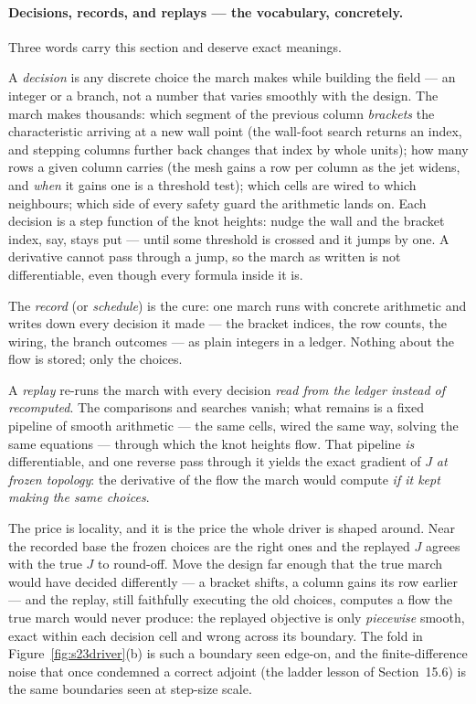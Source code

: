 \paragraph{Decisions, records, and replays --- the vocabulary,
concretely.} Three words carry this section and deserve exact
meanings.

A \emph{decision} is any discrete choice the march makes while
building the field --- an integer or a branch, not a number that
varies smoothly with the design. The march makes thousands: which
segment of the previous column \emph{brackets} the characteristic
arriving at a new wall point (the wall-foot search returns an index,
and stepping columns further back changes that index by whole
units); how many rows a given column carries (the mesh gains a row
per column as the jet widens, and \emph{when} it gains one is a
threshold test); which cells are wired to which neighbours; which
side of every safety guard the arithmetic lands on. Each decision is
a step function of the knot heights: nudge the wall and the bracket
index, say, stays put --- until some threshold is crossed and it
jumps by one. A derivative cannot pass through a jump, so the march
as written is not differentiable, even though every formula inside
it is.

The \emph{record} (or \emph{schedule}) is the cure: one march runs
with concrete arithmetic and writes down every decision it made ---
the bracket indices, the row counts, the wiring, the branch
outcomes --- as plain integers in a ledger. Nothing about the flow
is stored; only the choices.

A \emph{replay} re-runs the march with every decision \emph{read
from the ledger instead of recomputed}. The comparisons and searches
vanish; what remains is a fixed pipeline of smooth
arithmetic --- the same cells, wired the same way, solving the same
equations --- through which the knot heights flow. That pipeline
\emph{is} differentiable, and one reverse pass through it yields
the exact gradient of $J$ \emph{at frozen topology}: the derivative
of the flow the march would compute \emph{if it kept making the
same choices}.

The price is locality, and it is the price the whole driver is
shaped around. Near the recorded base the frozen choices are the
right ones and the replayed $J$ agrees with the true $J$ to
round-off. Move the design far enough that the true march would
have decided differently --- a bracket shifts, a column gains its
row earlier --- and the replay, still faithfully executing the old
choices, computes a flow the true march would never produce: the
replayed objective is only \emph{piecewise} smooth, exact within
each decision cell and wrong across its boundary. The fold in
Figure~\ref{fig:s23driver}(b) is such a boundary seen edge-on, and
the finite-difference noise that once condemned a correct adjoint
(the ladder lesson of Section~15.6) is the same boundaries seen at
step-size scale.


